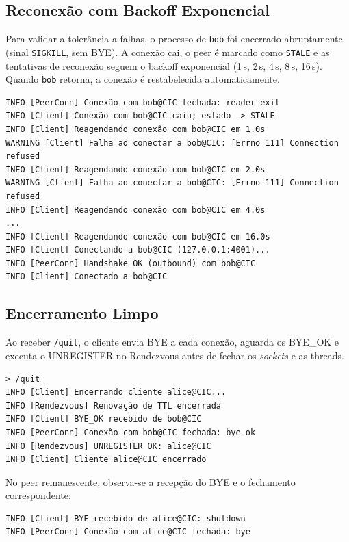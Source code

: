 \documentclass[12pt, a4paper]{article}
\begin{document}
\subsection{Reconexão com Backoff Exponencial}
Para validar a tolerância a falhas, o processo de \texttt{bob} foi encerrado abruptamente (sinal \texttt{SIGKILL}, sem BYE). A conexão cai, o peer é marcado como \texttt{STALE} e as tentativas de reconexão seguem o backoff exponencial (1\,s, 2\,s, 4\,s, 8\,s, 16\,s). Quando \texttt{bob} retorna, a conexão é restabelecida automaticamente.

\begin{lstlisting}[style=terminal]
INFO [PeerConn] Conexão com bob@CIC fechada: reader exit
INFO [Client] Conexão com bob@CIC caiu; estado -> STALE
INFO [Client] Reagendando conexão com bob@CIC em 1.0s
WARNING [Client] Falha ao conectar a bob@CIC: [Errno 111] Connection refused
INFO [Client] Reagendando conexão com bob@CIC em 2.0s
WARNING [Client] Falha ao conectar a bob@CIC: [Errno 111] Connection refused
INFO [Client] Reagendando conexão com bob@CIC em 4.0s
...
INFO [Client] Reagendando conexão com bob@CIC em 16.0s
INFO [Client] Conectando a bob@CIC (127.0.0.1:4001)...
INFO [PeerConn] Handshake OK (outbound) com bob@CIC
INFO [Client] Conectado a bob@CIC
\end{lstlisting}

\subsection{Encerramento Limpo}
Ao receber \texttt{/quit}, o cliente envia BYE a cada conexão, aguarda os BYE\_OK e executa o UNREGISTER no Rendezvous antes de fechar os \textit{sockets} e as threads.

\begin{lstlisting}[style=terminal]
> /quit
INFO [Client] Encerrando cliente alice@CIC...
INFO [Rendezvous] Renovação de TTL encerrada
INFO [Client] BYE_OK recebido de bob@CIC
INFO [PeerConn] Conexão com bob@CIC fechada: bye_ok
INFO [Rendezvous] UNREGISTER OK: alice@CIC
INFO [Client] Cliente alice@CIC encerrado
\end{lstlisting}

No peer remanescente, observa-se a recepção do BYE e o fechamento correspondente:

\begin{lstlisting}[style=terminal]
INFO [Client] BYE recebido de alice@CIC: shutdown
INFO [PeerConn] Conexão com alice@CIC fechada: bye
\end{lstlisting}
\end{document}
